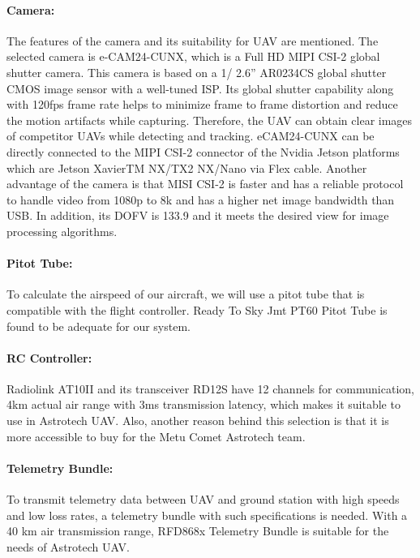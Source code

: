 \documentclass[12pt]{article}
\begin{document}
\paragraph*{Camera:} The features of the camera and its suitability for UAV  are mentioned. The selected camera is e-CAM24-CUNX, which is a Full HD MIPI CSI-2 global shutter camera. This camera is based on a 1/ 2.6” AR0234CS global shutter CMOS image sensor with a well-tuned ISP. Its global shutter capability along with 120fps frame rate helps to minimize frame to frame distortion and reduce the motion artifacts while capturing. Therefore, the UAV can obtain clear images of competitor UAVs while detecting and tracking. eCAM24-CUNX can be directly connected to the MIPI CSI-2 connector of the Nvidia Jetson platforms which are Jetson XavierTM NX/TX2 NX/Nano via Flex cable. Another advantage of the camera is that MISI CSI-2 is faster and has a reliable protocol to handle video from 1080p to 8k and has a higher net image bandwidth than USB. In addition, its DOFV is 133.9 and it meets the desired view for image processing algorithms.

\paragraph*{Pitot Tube:} To calculate the airspeed of our aircraft, we will use a pitot tube that is compatible with the flight controller. Ready To Sky Jmt PT60 Pitot Tube is found to be adequate for our system.

\paragraph*{RC Controller:} Radiolink AT10II and its transceiver RD12S have 12 channels for communication, 4km actual air range with 3ms transmission latency, which makes it suitable to use in Astrotech UAV. Also, another reason behind this selection is that it is more accessible to buy for the Metu Comet Astrotech team. 

\paragraph*{Telemetry Bundle:} To transmit telemetry data between UAV and ground station with high speeds and low loss rates, a telemetry bundle with such specifications is needed. With a 40 km air transmission range, RFD868x Telemetry Bundle is suitable for the needs of Astrotech UAV. 
\end{document}
